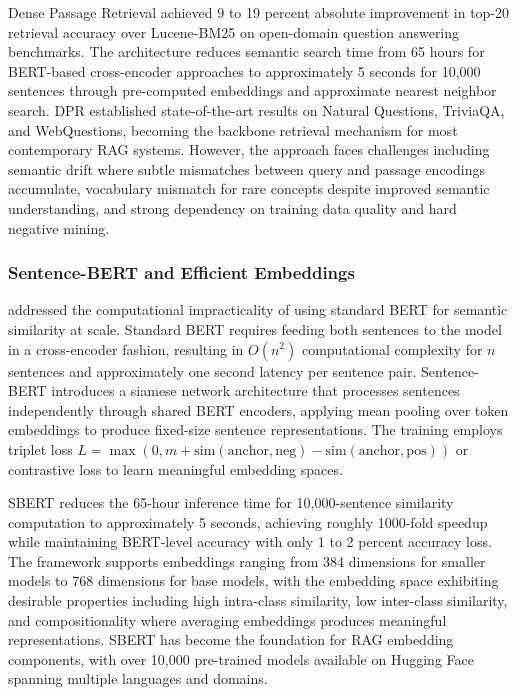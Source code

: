 Dense Passage Retrieval achieved 9 to 19 percent absolute improvement in top-20 retrieval accuracy over Lucene-BM25 on open-domain question answering benchmarks. The architecture reduces semantic search time from 65 hours for BERT-based cross-encoder approaches to approximately 5 seconds for 10,000 sentences through pre-computed embeddings and approximate nearest neighbor search. DPR established state-of-the-art results on Natural Questions, TriviaQA, and WebQuestions, becoming the backbone retrieval mechanism for most contemporary RAG systems. However, the approach faces challenges including semantic drift where subtle mismatches between query and passage encodings accumulate, vocabulary mismatch for rare concepts despite improved semantic understanding, and strong dependency on training data quality and hard negative mining.

\subsubsection{Sentence-BERT and Efficient Embeddings}

\citet{reimers2019sentencebert} addressed the computational impracticality of using standard BERT for semantic similarity at scale. Standard BERT requires feeding both sentences to the model in a cross-encoder fashion, resulting in $O(n^2)$ computational complexity for $n$ sentences and approximately one second latency per sentence pair. Sentence-BERT introduces a siamese network architecture that processes sentences independently through shared BERT encoders, applying mean pooling over token embeddings to produce fixed-size sentence representations. The training employs triplet loss $L = \max(0, m + \text{sim}(\text{anchor}, \text{neg}) - \text{sim}(\text{anchor}, \text{pos}))$ or contrastive loss to learn meaningful embedding spaces.

SBERT reduces the 65-hour inference time for 10,000-sentence similarity computation to approximately 5 seconds, achieving roughly 1000-fold speedup while maintaining BERT-level accuracy with only 1 to 2 percent accuracy loss. The framework supports embeddings ranging from 384 dimensions for smaller models to 768 dimensions for base models, with the embedding space exhibiting desirable properties including high intra-class similarity, low inter-class similarity, and compositionality where averaging embeddings produces meaningful representations. SBERT has become the foundation for RAG embedding components, with over 10,000 pre-trained models available on Hugging Face spanning multiple languages and domains.

